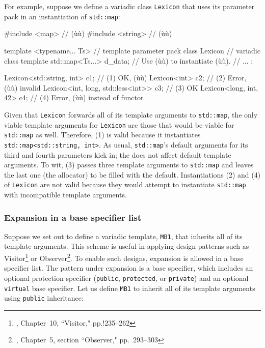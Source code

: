 For example, suppose we define a variadic class \lstinline!Lexicon! that
uses its parameter pack in an instantiation of \lstinline!std::map!:

\begin{emcppslisting}
#include <map>     // (ù{}ù)
#include <string>  // (ù{}ù)

template <typename... Ts>               // template parameter pack
class Lexicon                           // variadic class template
{
    std::map<Ts...> d_data;             // Use (ù{}ù) to instantiate (ù{}ù).
    // ...
};

Lexicon<std::string, int> c1;           // (1) OK, (ù{}ù)
Lexicon<int> c2;                        // (2) Error, (ù{}ù) invalid
Lexicon<int, long, std::less<int>> c3;  // (3) OK
Lexicon<long, int, 42> c4;              // (4) Error, (ù{}ù) instead of functor
\end{emcppslisting}
    

\noindent Given that \lstinline!Lexicon! forwards all of its template arguments to
\lstinline!std::map!, the only viable template arguments for
\lstinline!Lexicon! are those that would be viable for \lstinline!std::map! as
well. Therefore, (1) is valid because it instantiates
\lstinline!std::map<std::string,!~\lstinline!int>!. As usual,
\lstinline!std::map!'s default arguments for its third and fourth
parameters kick in; the  does not affect default
template arguments. To wit, (3) passes three template arguments to
\lstinline!std::map! and leaves the last one (the allocator) to be filled
with the default. Instantiations (2) and (4) of \lstinline!Lexicon! are not
valid because they would attempt to instantiate \lstinline!std::map! with
incompatible template arguments.

\subsubsection[Expansion in a base specifier list]{Expansion in a base specifier list}\label{expansion-in-a-base-specifier-list}

Suppose we set out to define a variadic template, \lstinline!MB1!, that
inherits all of its template arguments. This scheme is useful in
applying design patterns such as Visitor{\cprotect\footnote{\cite{alexandrescu01},
  Chapter~10, ``Visitor," pp.!235--262}} or
Observer{\cprotect\footnote{\cite{gamma95}, Chapter~5, section
  ``Observer," pp.~293--303}}. To enable such designs, expansion is
allowed in a base specifier list. The pattern under expansion is a base
specifier, which includes an optional protection specifier
(\lstinline!public!, \lstinline!protected!, or \lstinline!private!) and an
optional \lstinline!virtual! base specifier. Let us define \lstinline!MB1! to
inherit all of its template arguments using \lstinline!public! inheritance:

